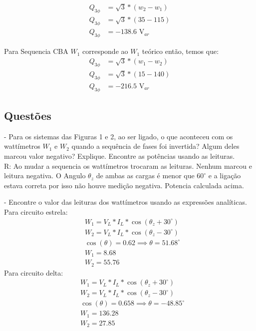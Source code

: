 \documentclass[a4paper, 12pt]{article}
\begin{document}
    \[\begin{split}
        Q_{3\phi} & = \sqrt{3}\ast(w_2 - w_1) \\
        Q_{3\phi} & = \sqrt{3}\ast(35 - 115 ) \\
        Q_{3\phi} & = -138.6 \text{ V}_{ar}
        \end{split}
    \]

    Para Sequencia CBA $W_1$ corresponde ao $W_1$ teórico então, temos que:
       \[\begin{split}
        Q_{3\phi} & = \sqrt{3}\ast(w_1 - w_2) \\
        Q_{3\phi} & = \sqrt{3}\ast(15 - 140 ) \\
        Q_{3\phi} & = -216.5 \text{ V}_{ar}
        \end{split}
    \]

    \subsection{Questões}
        \justifying
    - Para os sistemas das Figuras 1 e 2, ao ser ligado, o que aconteceu com os wattímetros
$W_1$ e $W_2$ quando a sequência de fases foi invertida? Algum deles marcou valor
negativo? Explique. Encontre as potências usando as leituras.\\
R: Ao mudar a sequencia os wattímetros trocaram as leituras. Nenhum marcou e leitura negativa. O Angulo $\theta _z$ de ambas as cargas é menor que $60^\circ$ e a ligação estava correta  por isso não houve medição negativa. Potencia calculada acima.

- Encontre o valor das leituras dos wattímetros usando as expressões analíticas.\\
Para circuito estrela:\\

  \[\begin{split}
        &W_1 = V_L\ast I_L \ast \cos(\theta _z + 30^\circ) \\
        &W_2 = V_L\ast I_L \ast \cos(\theta _z - 30^\circ)\\
        &\cos(\theta) = 0.62 \implies \theta = 51.68 ^\circ\\
        &W_1 = 8.68\\
        &W_2 = 55.76
    \end{split}
    \]
Para circuito delta:\\

  \[\begin{split}
        &W_1 = V_L\ast I_L \ast \cos(\theta _z + 30^\circ) \\
        &W_2 = V_L\ast I_L \ast \cos(\theta _z - 30^\circ)\\
        &\cos(\theta) = 0.658 \implies \theta = -48.85 ^\circ\\
        &W_1 = 136.28\\
        &W_2 = 27.85
    \end{split}
    \]
\end{document}
